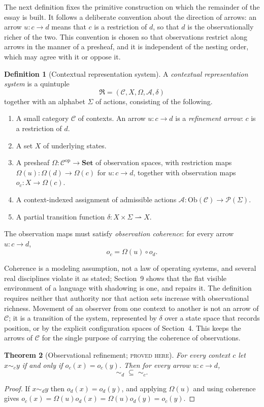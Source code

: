 \documentclass[11pt]{article}
\newtheorem{theorem}{Theorem}[section]
\theoremstyle{definition}
\newtheorem{definition}[theorem]{Definition}
\theoremstyle{remark}
\newcommand{\stN}{\textsc{proved here}}
\newcommand{\cC}{\mathcal C}
\newcommand{\cA}{\mathcal A}
\newcommand{\fR}{\mathfrak R}
\newcommand{\Set}{\mathbf{Set}}
\newcommand{\op}{\mathrm{op}}
\newcommand{\Ob}{\mathrm{Ob}}
\newcommand{\pfn}{\rightharpoonup}
\newcommand{\sk}{\sim}
\begin{document}
The next definition fixes the primitive construction on which the remainder of the essay is built. It follows a deliberate convention about the direction of arrows: an arrow $u:c\to d$ means that $c$ is a restriction of $d$, so that $d$ is the observationally richer of the two. This convention is chosen so that observations restrict along arrows in the manner of a presheaf, and it is independent of the nesting order, which may agree with it or oppose it.

\begin{definition}[Contextual representation system]\label{def:crs}
A \emph{contextual representation system} is a quintuple
\[
\fR=(\cC,X,\Omega,\cA,\delta)
\]
together with an alphabet $\Sigma$ of actions, consisting of the following.
\begin{enumerate}[label=(\arabic*)]
\item A small category $\cC$ of contexts. An arrow $u:c\to d$ is a \emph{refinement arrow}: $c$ is a restriction of $d$.
\item A set $X$ of underlying states.
\item A presheaf $\Omega:\cC^{\op}\to\Set$ of observation spaces, with restriction maps $\Omega(u):\Omega(d)\to\Omega(c)$ for $u:c\to d$, together with observation maps $o_c:X\to\Omega(c)$.
\item A context-indexed assignment of admissible actions $\cA:\Ob(\cC)\to\mathcal P(\Sigma)$.
\item A partial transition function $\delta:X\times\Sigma\pfn X$.
\end{enumerate}
The observation maps must satisfy \emph{observation coherence}: for every arrow $u:c\to d$,
\[
o_c=\Omega(u)\circ o_d.
\]
\end{definition}

Coherence is a modeling assumption, not a law of operating systems, and several real disciplines violate it as stated; Section~9 shows that the flat visible environment of a language with shadowing is one, and repairs it. The definition requires neither that authority nor that action sets increase with observational richness. Movement of an observer from one context to another is not an arrow of $\cC$; it is a transition of the system, represented by $\delta$ over a state space that records position, or by the explicit configuration spaces of Section~4. This keeps the arrows of $\cC$ for the single purpose of carrying the coherence of observations.

\begin{theorem}[Observational refinement; \stN]\label{thm:refinement}
For every context $c$ let $x\sk_c y$ if and only if $o_c(x)=o_c(y)$. Then for every arrow $u:c\to d$,
\[
{\sk_d}\;\subseteq\;{\sk_c}.
\]
\end{theorem}
\begin{proof}
If $x\sk_d y$ then $o_d(x)=o_d(y)$, and applying $\Omega(u)$ and using coherence gives $o_c(x)=\Omega(u)o_d(x)=\Omega(u)o_d(y)=o_c(y)$.
\end{proof}
\end{document}
